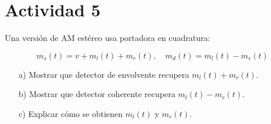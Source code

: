 \section{Actividad 5}

Una versión de AM estéreo usa portadora en cuadratura:  

\[
m_s(t) = v + m_l(t) + m_r(t), \quad m_d(t) = m_l(t) - m_r(t)
\]  

\begin{itemize}
    \item[a)] Mostrar que detector de envolvente recupera $m_l(t)+m_r(t)$.  
    \item[b)] Mostrar que detector coherente recupera $m_l(t)-m_r(t)$.  
    \item[c)] Explicar cómo se obtienen $m_l(t)$ y $m_r(t)$.  
\end{itemize}
